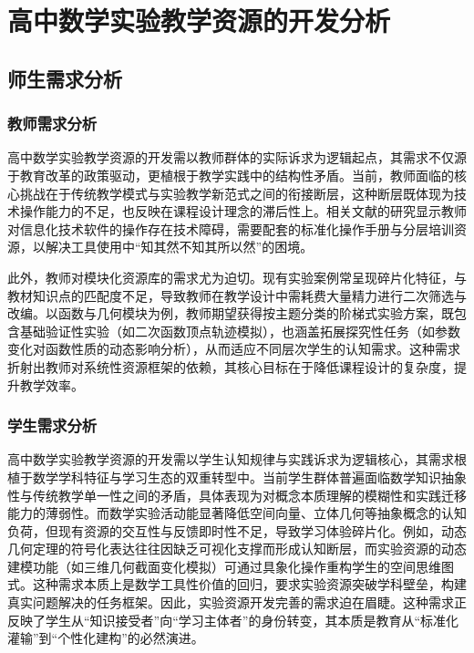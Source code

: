 
\chapter{高中数学实验教学资源的开发分析}
\section{师生需求分析}
\subsection{教师需求分析}
高中数学实验教学资源的开发需以教师群体的实际诉求为逻辑起点，其需求不仅源于教育改革的政策驱动，更植根于教学实践中的结构性矛盾。当前，教师面临的核心挑战在于传统教学模式与实验教学新范式之间的衔接断层，这种断层既体现为技术操作能力的不足，也反映在课程设计理念的滞后性上。相关文献的研究显示教师对信息化技术软件的操作存在技术障碍\cite{2015_李红梅_数学教师信息技术应用质量评估指标权重的确定}，需要配套的标准化操作手册与分层培训资源，以解决工具使用中“知其然不知其所以然”的困境。

此外，教师对模块化资源库的需求尤为迫切。现有实验案例常呈现碎片化特征，与教材知识点的匹配度不足，导致教师在教学设计中需耗费大量精力进行二次筛选与改编。以函数与几何模块为例，教师期望获得按主题分类的阶梯式实验方案，既包含基础验证性实验（如二次函数顶点轨迹模拟），也涵盖拓展探究性任务（如参数变化对函数性质的动态影响分析），从而适应不同层次学生的认知需求。这种需求折射出教师对系统性资源框架的依赖，其核心目标在于降低课程设计的复杂度，提升教学效率。

\subsection{学生需求分析}
高中数学实验教学资源的开发需以学生认知规律与实践诉求为逻辑核心，其需求根植于数学学科特征与学习生态的双重转型中。当前学生群体普遍面临数学知识抽象性与传统教学单一性之间的矛盾，具体表现为对概念本质理解的模糊性和实践迁移能力的薄弱性。而数学实验活动能显著降低空间向量、立体几何等抽象概念的认知负荷，但现有资源的交互性与反馈即时性不足，导致学习体验碎片化。例如，动态几何定理的符号化表达往往因缺乏可视化支撑而形成认知断层，而实验资源的动态建模功能（如三维几何截面变化模拟）可通过具象化操作重构学生的空间思维图式。这种需求本质上是数学工具性价值的回归，要求实验资源突破学科壁垒，构建真实问题解决的任务框架。因此，实验资源开发完善的需求迫在眉睫。这种需求正反映了学生从“知识接受者”向“学习主体者”的身份转变，其本质是教育从“标准化灌输”到“个性化建构”的必然演进。



